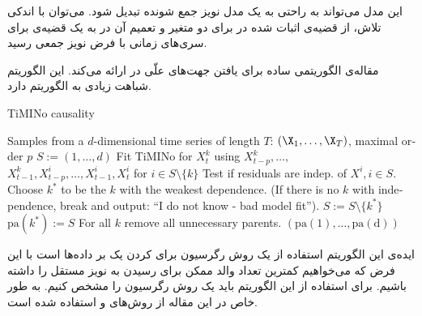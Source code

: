 \documentclass[a4paper,12pt]{article}
\begin{document}
این مدل می‌تواند به راحتی به یک مدل نویز جمع شونده تبدیل شود. می‌توان با اندکی تلاش، از قضیه‌ی اثبات شده در 
\cite{hoyer}
برای دو متغیر و تعمیم آن در 
\cite{continous}
به یک قضیه‌ی 
برای سری‌های زمانی 
با فرض نویز جمعی رسید.


مقاله‌ی 
\cite{time}
الگوریتمی ساده برای یافتن جهت‌های علّی در 
ارائه می‌کند. این الگوریتم شباهت زیادی به الگوریتم  
دارد.
\begin{latin}
\begin{algorithm}[h!]
	\caption{TiMINo causality}
	\begin{algorithmic}[1]
		 Samples from a $d$-dimensional time series of length $T$: $(\X_1, \ldots, \X_T)$, maximal order $p$\vspace{0.0cm}
		\STATE $S:=(1, \ldots, d)$ 
		\REPEAT
		\STATE Fit TiMINo for $X^k_t$ using $X^k_{t-p}, \ldots,$ $X^k_{t-1}, X^i_{t-p}, \ldots, X^i_{t-1}, X^i_t$ for $i \in S \setminus \{k\}$%
		\STATE Test if residuals are indep. of $X^i, i \in S$.  
		\ENDFOR
		\STATE Choose $k^*$ to be the $k$ with the weakest dependence. (If there is no $k$ with independence, break and output: ``I do not know - bad model fit'').
		\STATE $S:=S \setminus \{k^*\}$
		\STATE $\mathrm{pa}(k^*):=S$
		\STATE For all $k$ remove all unnecessary parents.\vspace{0.0cm}
		 $(\mathrm{pa(1)}, \ldots, \mathrm{pa(d)})$
	\end{algorithmic}
\end{algorithm}
\end{latin}
ایده‌ی این الگوریتم استفاده از یک روش رگرسیون برای 
کردن یک 
بر داده‌ها است با این فرض که می‌خواهیم کمترین تعداد والد ممکن برای رسیدن به نویز مستقل را داشته باشیم. برای استفاده از این الگوریتم باید یک روش رگرسیون را مشخص کنیم. به طور خاص در این مقاله از روش‌های 
و
استفاده شده است.
\end{document}

